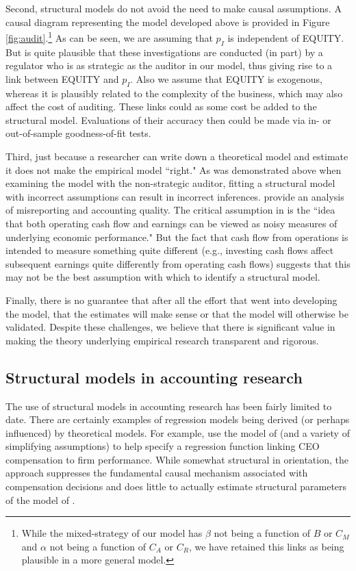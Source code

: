 Second, structural models do not avoid the need to make causal assumptions.
A causal diagram representing the model developed above is provided in Figure \ref{fig:audit}.\footnote{
While the mixed-strategy of our model has $\beta$ not being a function of $B$ or $C_M$ and $\alpha$ not being a function of $C_A$ or $C_R$, we have retained this links as being plausible in a more general model.}
As can be seen, we are assuming that $p_I$ is independent of EQUITY. 
But is quite plausible that these investigations are conducted (in part) by a regulator who is as strategic as the auditor in our model, thus giving rise to a link between EQUITY and $p_I$.
Also we assume that EQUITY is exogenous, whereas it is plausibly related to the complexity of the business, which may also affect the cost of auditing.
These links could as some cost be added to the structural model. 
Evaluations of their accuracy then could be made via in- or out-of-sample goodness-of-fit tests.

Third, just because a researcher can write down a theoretical model and estimate it does not make the empirical model ``right."
As was demonstrated above when examining the model with the non-strategic auditor, fitting a structural model with incorrect assumptions can result in incorrect inferences.
 \cite{Nikolaev:2014er} provide an analysis of misreporting and accounting quality.
 The critical assumption in \citet[p.\,6]{Nikolaev:2014er} is the ``idea that both operating cash flow and earnings can be viewed as noisy measures of underlying economic performance."
But the fact that cash flow from operations is intended to measure something quite different (e.g., investing cash flows affect subsequent earnings quite differently from operating cash flows) suggests that this may not be the best assumption with which to identify a structural model.

Finally, there is no guarantee that after all the effort that went into developing the model, that the estimates will make sense or that the model will otherwise be validated.
Despite these challenges, we believe that there is significant value in making the theory underlying empirical research transparent and rigorous.

\subsection{Structural models in accounting research}
The use of structural models in accounting research has been fairly limited to date.
There are certainly examples of regression models being derived (or perhaps influenced) by theoretical models.
For example, \citet{Lambert:1987} use the model of \citet{Holmstrom:1979aa} (and a variety of simplifying assumptions) to help specify a regression function linking CEO compensation to firm performance.
While somewhat structural in orientation, the approach suppresses the fundamental causal mechanism associated with compensation decisions and does little to actually estimate structural parameters of the model of \citet{Holmstrom:1979aa}.

